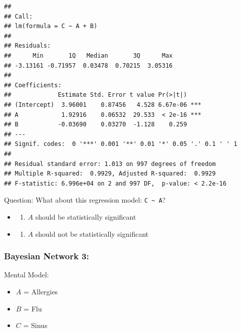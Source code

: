 \documentclass[
]{article}
\providecommand{\tightlist}{%
  \setlength{\itemsep}{0pt}\setlength{\parskip}{0pt}}
\begin{document}
\begin{verbatim}
## 
## Call:
## lm(formula = C ~ A + B)
## 
## Residuals:
##      Min       1Q   Median       3Q      Max 
## -3.13161 -0.71957  0.03478  0.70215  3.05316 
## 
## Coefficients:
##             Estimate Std. Error t value Pr(>|t|)    
## (Intercept)  3.96001    0.87456   4.528 6.67e-06 ***
## A            1.92916    0.06532  29.533  < 2e-16 ***
## B           -0.03690    0.03270  -1.128    0.259    
## ---
## Signif. codes:  0 '***' 0.001 '**' 0.01 '*' 0.05 '.' 0.1 ' ' 1
## 
## Residual standard error: 1.013 on 997 degrees of freedom
## Multiple R-squared:  0.9929, Adjusted R-squared:  0.9929 
## F-statistic: 6.996e+04 on 2 and 997 DF,  p-value: < 2.2e-16
\end{verbatim}

Question: What about this regression model:
\texttt{C\ \textasciitilde{}\ A}?

\begin{itemize}
\item
  \begin{enumerate}
  \def\labelenumi{\alph{enumi})}
  \tightlist
  \item
    \(A\) should be statistically significant
  \end{enumerate}
\item
  \begin{enumerate}
  \def\labelenumi{\alph{enumi})}
  \setcounter{enumi}{1}
  \tightlist
  \item
    \(A\) should not be statistically significant
  \end{enumerate}
\end{itemize}

\hypertarget{bayesian-network-3}{%
\subsubsection{Bayesian Network 3:}\label{bayesian-network-3}}

\hypertarget{htmlwidget-b338999871153722f361}{}
\begin{grViz}

\end{grViz}

Mental Model:

\begin{itemize}
\tightlist
\item
  \(A\) = Allergies
\item
  \(B\) = Flu
\item
  \(C\) = Sinus
\end{itemize}
\end{document}
